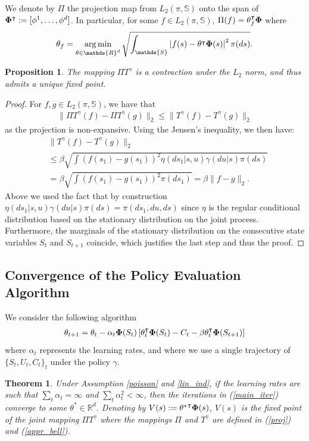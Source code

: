 \documentclass[11pt]{article}
\newtheorem{theorem}{Theorem}
\newtheorem{prop}{Proposition}
\def\argmin{\mathop{\rm arg\, min}}
\begin{document}
We denote by $\Pi$ the projection map from $ L_2(\pi,\mathds{S})$ onto the span of ${\bf \Phi}^\intercal:= [\phi^1,\dots,\phi^d]$. In particular, for some $f\in  L_2(\pi,\mathds{S})$, $\Pi(f) = \theta_f^\intercal {\bf \Phi} $ where 
\begin{align}\label{proj}
\theta_f =\argmin_{\theta\in\mathds{R}^d} \sqrt{\int_{\mathds{S}} \left| f(s) - \theta^\intercal {\bf \Phi}(s)\right|^2 \pi(ds)}.
\end{align}



\begin{prop}\label{comp_contr}
The mapping $\Pi T^\gamma$ is a contraction under the $L_2$ norm, and thus admits a unique fixed point.
\end{prop}
\begin{proof}
For $f,g \in L_2(\pi,\mathds{S})$, we have that
\begin{align*}
\|\Pi T^\gamma (f) - \Pi T^\gamma (g)\|_2 \leq  \| T^\gamma (f) -  T^\gamma (g)\|_2 
\end{align*}
as the projection is non-expansive. Using the Jensen's inequality, we then have:
\begin{align*}
&\| T^\gamma (f) -  T^\gamma (g)\|_2\\
& \leq \beta \sqrt{   \int \left(f(s_1) - g(s_1)\right)^2\eta(ds_1|s,u)\gamma(du|s) \pi(ds) }\\
&=\beta  \sqrt{   \int \left(f(s_1) - g(s_1)\right)^2\pi(ds_1) } = \beta \|f-g\|_2.
\end{align*}
Above we used the fact that by construction  $\eta(ds_1|s,u)\gamma(du|s) \pi(ds) =\pi(ds_1,du,ds) $ since $\eta$ is the regular conditional distribution based on the stationary distribution on the joint process. Furthermore, the marginals of the stationary distribution on the consecutive state variables $S_t$ and $S_{t+1}$ coincide, which justifies the last step and thus the proof.
\end{proof}


\subsection{Convergence of the Policy Evaluation Algorithm}\label{pol_eval_conv_sec}
We consider the following algorithm
\begin{align}\label{main_iter}
\theta_{t+1}= \theta_t - \alpha_t {\bf \Phi}(S_t) \left[\theta_t^\intercal {\bf \Phi}(S_t) - C_t - \beta \theta^\intercal_t{\bf \Phi}(S_{t+1}) \right]
\end{align}
where $\alpha_t$ represents the learning rates, and where we use a single trajectory of $\{S_t,U_t,C_t\}_{t}$ under the policy $\gamma$.
\begin{theorem}\label{main_thm}
Under Assumption \ref{poisson} and \ref{lin_ind}, if the learning rates are such that $\sum_t\alpha_t = \infty$ and $\sum_t \alpha_t^2<\infty$, then the iterations in (\ref{main_iter}) converge to some $\theta^* \in\mathds{R}^d$. Denoting by $V(s):={\theta^*}^\intercal {\bf \Phi}(s)$, $V(s)$ is the fixed point of the joint mapping $\Pi T^\gamma $ where the mappings $\Pi$ and $T^\gamma$ are defined in (\ref{proj}) and (\ref{appr_bell}).
\end{theorem}
\end{document}
